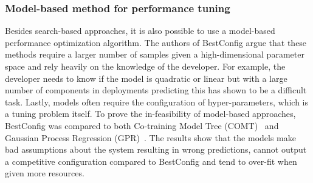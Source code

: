 \subsubsection{Model-based method for performance tuning}
Besides search-based approaches, it is also possible to use a model-based performance optimization algorithm. The authors of BestConfig argue that these methods require a larger number of samples given a high-dimensional parameter space and rely heavily on the knowledge of the developer. For example, the developer needs to know if the model is quadratic or linear but with a large number of components in deployments predicting this has shown to be a difficult task. Lastly, models often require the configuration of hyper-parameters, which is a tuning problem itself. To prove the in-feasibility of model-based approaches, BestConfig was compared to both Co-training Model Tree (COMT)~\cite{chen2013effective} and Gaussian Process Regression (GPR)~\cite{duan2009tuning}. The results show that the models make bad assumptions about the system resulting in wrong predictions, cannot output a competitive configuration compared to BestConfig and tend to over-fit when given more resources.~\cite{zhu2017bestconfig}


